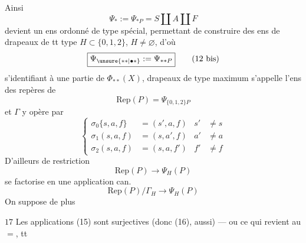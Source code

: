 Ainsi
\[
 \boxed{\Psi_*:=\Psi_{*P}=S\amalg A\amalg F}\tag*{(12)}
\]
devient un ens ordonné de type spécial, permettant de construire des ens de drapeaux de tt type $H\subset\{0,1,2\}$, $H\ne\varnothing$,  d'où
\[
 \boxed{\Psi_{\unsure{**|\bullet *}}:=\Psi_{**P}}\tag*{(12 bis)}
\]
s'identifiant à une partie de $\Phi_{**}(X)$,   drapeaux de type maximum    s'appelle l'ens des repères de   
\[
 \mathrm{Rep}(P)=\Psi_{\{0,1,2\}P}\tag*{(13)}
\]
et $\Gamma$ y opère par
\[
 \left\{\begin{aligned}
 \sigma_0\{s,a,f\}&=(s',a,f)&s'&\ne s\\
 \sigma_1(s,a,f)&=(s,a',f)&a'&\ne a\\
 \sigma_2(s,a,f)&=(s,a,f')&f'&\ne f
 \end{aligned}\right.\tag*{(14)}
\]
 D'ailleurs   de restriction
\[
 \mathrm{Rep}(P)\longrightarrow\Psi_H(P)\tag*{(15)}
\]
se factorise en une application can.
\[
 \mathrm{Rep}(P)/\Gamma_H\longrightarrow\Psi_H(P)\tag*{(16)}
\]
 On suppose de plus

$\boxed{17}$ Les applications (15) sont surjectives (donc (16), aussi) --- ou ce qui revient au $=$,  tt     
